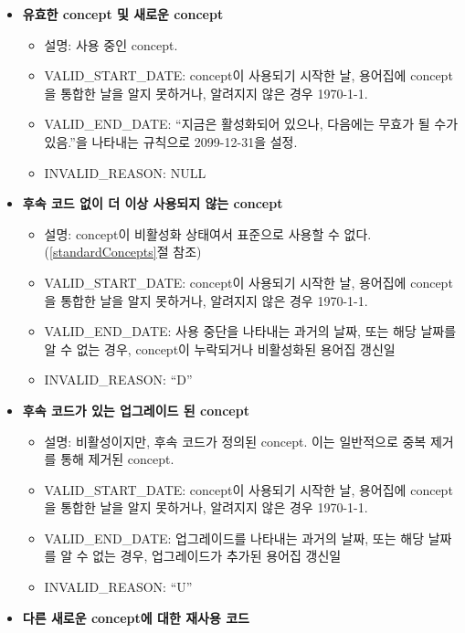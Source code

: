 \documentclass[10.5pt]{book}
\providecommand{\tightlist}{%
  \setlength{\itemsep}{0pt}\setlength{\parskip}{0pt}}
\theoremstyle{definition}
\theoremstyle{definition}
\theoremstyle{definition}
\theoremstyle{remark}
\begin{document}
\begin{itemize}
\tightlist
\item
  \textbf{유효한 concept 및 새로운 concept}

  \begin{itemize}
  \tightlist
  \item
    설명: 사용 중인 concept.
  \item
    VALID\_START\_DATE: concept이 사용되기 시작한 날, 용어집에 concept을
    통합한 날을 알지 못하거나, 알려지지 않은 경우 1970-1-1.
  \item
    VALID\_END\_DATE: ``지금은 활성화되어 있으나, 다음에는 무효가 될
    수가 있음.''을 나타내는 규칙으로 2099-12-31을 설정.
  \item
    INVALID\_REASON: NULL
  \end{itemize}
\item
  \textbf{후속 코드 없이 더 이상 사용되지 않는 concept}

  \begin{itemize}
  \tightlist
  \item
    설명: concept이 비활성화 상태여서 표준으로 사용할 수 없다.
    (\ref{standardConcepts}절 참조)
  \item
    VALID\_START\_DATE: concept이 사용되기 시작한 날, 용어집에 concept을
    통합한 날을 알지 못하거나, 알려지지 않은 경우 1970-1-1.
  \item
    VALID\_END\_DATE: 사용 중단을 나타내는 과거의 날짜, 또는 해당 날짜를
    알 수 없는 경우, concept이 누락되거나 비활성화된 용어집 갱신일
  \item
    INVALID\_REASON: ``D''
  \end{itemize}
\item
  \textbf{후속 코드가 있는 업그레이드 된 concept}

  \begin{itemize}
  \tightlist
  \item
    설명: 비활성이지만, 후속 코드가 정의된 concept. 이는 일반적으로 중복
    제거를 통해 제거된 concept.
  \item
    VALID\_START\_DATE: concept이 사용되기 시작한 날, 용어집에 concept을
    통합한 날을 알지 못하거나, 알려지지 않은 경우 1970-1-1.
  \item
    VALID\_END\_DATE: 업그레이드를 나타내는 과거의 날짜, 또는 해당
    날짜를 알 수 없는 경우, 업그레이드가 추가된 용어집 갱신일
  \item
    INVALID\_REASON: ``U''
  \end{itemize}
\item
  \textbf{다른 새로운 concept에 대한 재사용 코드}


\end{itemize}
\end{document}
